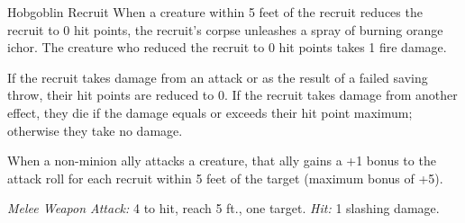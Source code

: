 \documentclass[10pt,a4paper,twoside,bg=print,twocolumn,openany,nodeprecatedcode]{dndbook}
\begin{document}
\begin{DndMonster}[float=t]{Hobgoblin Recruit}
\DndMonsterBasics[
armor-class = {14 (\textit{leather armor})},
hit-points = {\DndDice{7}},
speed = {30 ft.}
]
\DndMonsterAbilityScores[
 str = 14,
 dex = 13,
 con = 12,
 int = 11,
 wis = 12,
 cha = 10
]
\DndMonsterDetails[
damage-immunities = {fire},
senses = {darkvision 60 ft., passive perception 11},
languages = {Common, Goblin, Infernal},
challenge = 1/2,
]
When a creature within 5 feet of the recruit reduces the recruit to 0 hit points, the recruit's corpse unleashes a spray of burning orange ichor. The creature who reduced the recruit to 0 hit points takes 1 fire damage.

If the recruit takes damage from an attack or as the result of a failed saving throw, their hit points are reduced to 0. If the recruit takes damage from another effect, they die if the damage equals or exceeds their hit point maximum; otherwise they take no damage.

When a non-minion ally attacks a creature, that ally gains a +1 bonus to the attack roll for each recruit within 5 feet of the target (maximum bonus of +5).

\textsl{Melee Weapon Attack:} 4 to hit, reach 5 ft., one target. \textsl{Hit:} 1 slashing damage.

\end{DndMonster}
\end{document}
